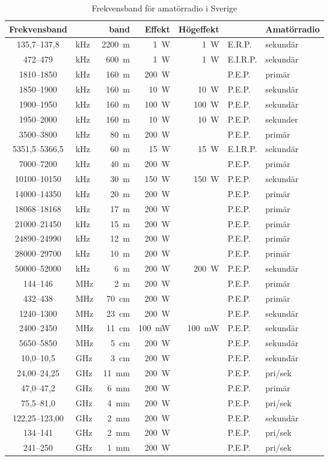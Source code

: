 \begin{table*}[b!]
  \centering
\caption{Frekvensband för amatörradio i Sverige}
\label{frekvensplan}
\begin{tabular}{clr|rrl|l}
Frekvensband &  & band & Effekt & Högeffekt & & Amatörradio\\ \hline
135,7--137,8 & kHz & 2200~m & 1~W & 1~W & E.R.P. & sekundär\\
472--479 & kHz & 600~m & 1~W & 1~W & E.I.R.P. & sekundär\\
1810--1850 & kHz & 160~m & 200~W & & P.E.P. & primär\\
1850--1900 & kHz & 160~m & 10~W & 10~W & P.E.P. & sekundär\\
1900--1950 & kHz & 160~m & 100~W & 100~W & P.E.P. & sekundär\\
1950--2000 & kHz & 160~m & 10~W & 10~W & P.E.P. & sekunder\\
3500--3800 & kHz & 80~m  & 200~W & & P.E.P. & primär\\
5351,5--5366,5 & kHz & 60~m & 15~W & 15~W & E.I.R.P. & sekundär\\
7000--7200 & kHz & 40~m  & 200~W & & P.E.P. & primär\\
10100--10150 & kHz & 30~m & 150~W & 150~W & P.E.P. & sekundär\\
14000--14350 & kHz & 20~m & 200~W & & P.E.P. & primär\\
18068--18168 & kHz & 17~m & 200~W & & P.E.P. & primär\\
21000--21450 & kHz & 15~m & 200~W & & P.E.P. & primär\\
24890--24990 & kHz & 12~m & 200~W & & P.E.P. & primär\\
28000--29700 & kHz & 10~m & 200~W & & P.E.P. & primär\\
50000--52000 & kHz & 6~m & 200~W & 200~W & P.E.P. & sekundär\\ \hline
144--146 & MHz & 2~m & 200~W & & P.E.P. & primär\\
432--438 & MHz & 70~cm & 200~W & & P.E.P. & primär\\
1240--1300 & MHz & 23~cm & 200~W & & P.E.P. & sekundär\\
2400--2450 & MHz & 11~cm & 100~mW & 100~mW & P.E.P. & sekundär\\
5650--5850 & MHz & 5~cm & 200~W & & P.E.P. & sekundär\\
10,0--10,5 & GHz & 3~cm & 200~W & & P.E.P. & sekundär\\
24,00--24,25 & GHz & 11~mm & 200~W & & P.E.P. & pri/sek\\
47,0--47,2 & GHz & 6~mm & 200~W & & P.E.P. & primär\\
75,5--81,0 & GHz & 4~mm & 200~W & & P.E.P. & pri/sek\\
122,25--123,00 & GHz & 2~mm & 200~W & & P.E.P. & sekundär\\
134--141 & GHz & 2~mm & 200~W & & P.E.P. & pri/sek\\
241--250 & GHz & 1~mm & 200~W & & P.E.P. & pri/sek\\
\end{tabular}
\end{table*}

